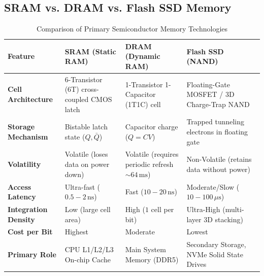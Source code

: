 \subsection{SRAM vs. DRAM vs. Flash SSD Memory}
\begin{table}[htbp]
\centering
\small
\caption{Comparison of Primary Semiconductor Memory Technologies}
\label{tab:memory_technologies}
\begin{tabularx}{\textwidth}{lXXX}
\toprule
\textbf{Feature} & \textbf{SRAM (Static RAM)} & \textbf{DRAM (Dynamic RAM)} & \textbf{Flash SSD (NAND)} \\
\midrule
\textbf{Cell Architecture} & 6-Transistor (6T) cross-coupled CMOS latch & 1-Transistor 1-Capacitor (1T1C) cell & Floating-Gate MOSFET / 3D Charge-Trap NAND \\
\textbf{Storage Mechanism} & Bistable latch state ($Q, \bar{Q}$) & Capacitor charge ($Q = C V$) & Trapped tunneling electrons in floating gate \\
\textbf{Volatility} & Volatile (loses data on power down) & Volatile (requires periodic refresh $\sim 64\,\text{ms}$) & Non-Volatile (retains data without power) \\
\textbf{Access Latency} & Ultra-fast ($0.5 - 2\,\text{ns}$) & Fast ($10 - 20\,\text{ns}$) & Moderate/Slow ($10 - 100\,\mu\text{s}$) \\
\textbf{Integration Density} & Low (large cell area) & High ($1$ cell per bit) & Ultra-High (multi-layer 3D stacking) \\
\textbf{Cost per Bit} & Highest & Moderate & Lowest \\
\textbf{Primary Role} & CPU L1/L2/L3 On-chip Cache & Main System Memory (DDR5) & Secondary Storage, NVMe Solid State Drives \\
\bottomrule
\end{tabularx}
\end{table}


